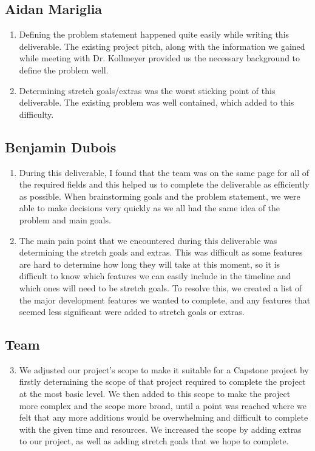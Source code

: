 \documentclass{article}
\begin{document}
\subsection*{Aidan Mariglia}

\begin{enumerate}
    \item Defining the problem statement happened quite easily while writing this deliverable. The existing project pitch, along with the information we gained while meeting with Dr. Kollmeyer provided us the necessary background to define the problem well.
    \item Determining stretch goals/extras was the worst sticking point of this deliverable. The existing problem was well contained, which added to this difficulty.
\end{enumerate}  

\subsection*{Benjamin Dubois}

\begin{enumerate}
    \item During this deliverable, I found that the team was on the same page for all of the required fields and this helped us to complete the deliverable as efficiently as possible. When brainstorming goals and the problem statement, we were able to make decisions very quickly as we all had the same idea of the problem and main goals. 
    \item The main pain point that we encountered during this deliverable was determining the stretch goals and extras. This was difficult as some features are hard to determine how long they will take at this moment, so it is difficult to know which features we can easily include in the timeline and which ones will need to be stretch goals. To resolve this, we created a list of the major development features we wanted to complete, and any features that seemed less significant were added to stretch goals or extras. 
\end{enumerate}  

\subsection*{Team}

\begin{enumerate}
\setcounter{enumi}{2}
    \item We adjusted our project’s scope to make it suitable for a Capstone project by firstly determining the scope of that project required to complete the project at the most basic level. We then added to this scope to make the project more complex and the scope more broad, until a point was reached where we felt that any more additions would be overwhelming and difficult to complete with the given time and resources. We increased the scope by adding extras to our project, as well as adding stretch goals that we hope to complete.
 
\end{enumerate} 
\end{document}
